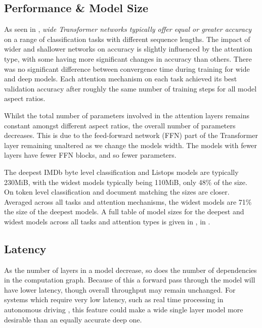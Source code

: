 \subsection{Performance \& Model Size}\label{sec:disscusion:perf}

As seen in , \emph{wide Transformer networks typically offer equal or greater accuracy} on a range of classification tasks with different sequence lengths.
The impact of wider and shallower networks on accuracy is slightly influenced by the attention type, with some having more significant changes in accuracy than others.
There was no significant difference between convergence time during training for wide and deep models.
Each attention mechanism on each task achieved its best validation accuracy after roughly the same number of training steps for all model aspect ratios.

Whilst the total number of parameters involved in the attention layers remains constant amongst different aspect ratios, the overall number of parameters decreases.
This is due to the feed-forward network (FFN) part of the Transformer layer remaining unaltered as we change the models width.
The models with fewer layers have fewer FFN blocks, and so fewer parameters.

The deepest IMDb byte level classification and Listops models are typically 230MiB, with the widest models typically being 110MiB, only 48\% of the size.
On token level classification and document matching the sizes are closer.
Averaged across all tasks and attention mechanisms, the widest models are 71\% the size of the deepest models.
A full table of model sizes for the deepest and widest models across all tasks and attention types is given in , in .


\subsection{Latency}\label{sec:disscusion:lat}

As the number of layers in a model decrease, so does the number of dependencies in the computation graph.
Because of this a forward pass through the model will have lower latency, though overall throughput may remain unchanged.
For systems which require very low latency, such as real time processing in autonomous driving \citep{talpes2020compute}, this feature could make a wide single layer model more desirable than an equally accurate deep one.

